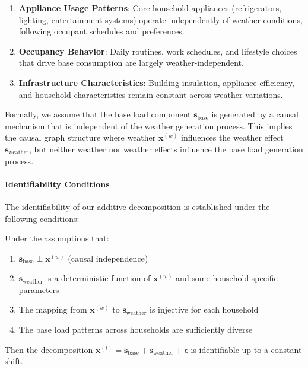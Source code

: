 \documentclass[journal]{IEEEtran}
\begin{document}
\begin{enumerate}
    \item \textbf{Appliance Usage Patterns}: Core household appliances (refrigerators, lighting, entertainment systems) operate independently of weather conditions, following occupant schedules and preferences.
    \item \textbf{Occupancy Behavior}: Daily routines, work schedules, and lifestyle choices that drive base consumption are largely weather-independent.
    \item \textbf{Infrastructure Characteristics}: Building insulation, appliance efficiency, and household characteristics remain constant across weather variations.
\end{enumerate}

Formally, we assume that the base load component $\mathbf{s}_{\text{base}}$ is generated by a causal mechanism that is independent of the weather generation process. This implies the causal graph structure where weather $\mathbf{x}^{(w)}$ influences the weather effect $\mathbf{s}_{\text{weather}}$, but neither weather nor weather effects influence the base load generation process.

\paragraph{Identifiability Conditions}
The identifiability of our additive decomposition is established under the following conditions:

\begin{theorem}
Under the assumptions that:
\begin{enumerate}
    \item $\mathbf{s}_{\text{base}} \perp \mathbf{x}^{(w)}$ (causal independence)
    \item $\mathbf{s}_{\text{weather}}$ is a deterministic function of $\mathbf{x}^{(w)}$ and some household-specific parameters
    \item The mapping from $\mathbf{x}^{(w)}$ to $\mathbf{s}_{\text{weather}}$ is injective for each household
    \item The base load patterns across households are sufficiently diverse
\end{enumerate}
Then the decomposition $\mathbf{x}^{(l)} = \mathbf{s}_{\text{base}} + \mathbf{s}_{\text{weather}} + \boldsymbol{\epsilon}$ is identifiable up to a constant shift.
\end{theorem}
\end{document}
